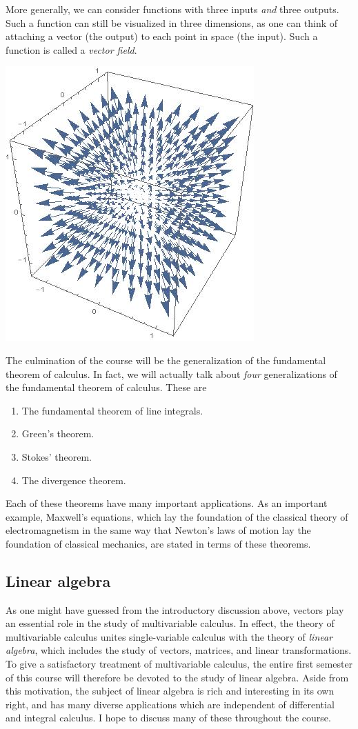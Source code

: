 \documentclass[12pt,letterpaper,reqno]{article}
\numberwithin{equation}{section}
\newcommand{\ti}[1]{\textit{#1}}
\begin{document}
More generally, we can consider functions with three inputs \ti{and} three outputs. Such a function can still be visualized in three dimensions, as one can think of attaching a vector (the output) to each point in space (the input). Such a function is called a \ti{vector field}.
\begin{center}
	\includegraphics[scale=0.5]{figures_mvc/vector_field_example}
\end{center}

The culmination of the course will be the generalization of the fundamental theorem of calculus. In fact, we will actually talk about \ti{four} generalizations of the fundamental theorem of calculus. These are 
\begin{enumerate}
	\item The fundamental theorem of line integrals.
	\item Green's theorem.
	\item Stokes' theorem.
	\item The divergence theorem.
\end{enumerate}
Each of these theorems have many important applications. As an important example, Maxwell's equations, which lay the foundation of the classical theory of electromagnetism in the same way that Newton's laws of motion lay the foundation of classical mechanics, are stated in terms of these theorems. 

\subsection{Linear algebra}
As one might have guessed from the introductory discussion above, vectors play an essential role in the study of multivariable calculus. In effect, the theory of multivariable calculus unites single-variable calculus with the theory of \ti{linear algebra}, which includes the study of vectors, matrices, and linear transformations. To give a satisfactory treatment of multivariable calculus, the entire first semester of this course will therefore be devoted to the study of linear algebra. Aside from this motivation, the subject of linear algebra is rich and interesting in its own right, and has many diverse applications which are independent of differential and integral calculus. I hope to discuss many of these throughout the course.
\end{document}
